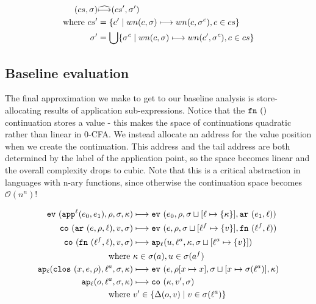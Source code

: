 \documentclass[preprint,onecolumn,9pt]{sigplanconf} %
\begin{document}
\begin{align*}
(cs, \msto) &\widehat{\machstep} (cs', \msto') \\
\mbox{where } cs' &= \{c' \mid wn(c, \msto) \machstep wn(c, \msto^c), c \in cs\} \\
              \msto' &= \bigcup\{\msto^c \mid wn(c,\msto)\machstep wn(c', \msto^c), c \in cs\}
\end{align*}

\subsection{Baseline evaluation}
\label{sec:baselineeval}

The final approximation we make to get to our baseline analysis is
store-allocating results of application sub-expressions. Notice that
the $\kfn{}$ continuation stores a value - this makes the space of
continuations quadratic rather than linear in 0-CFA. We instead
allocate an address for the value position when we create the
continuation. This address and the tail address are both determined by
the label of the application point, so the space becomes linear and
the overall complexity drops to cubic. Note that this is a critical
abstraction in languages with n-ary functions, since otherwise the
continuation space becomes ${\mathcal O}(n^n)$!

\begin{align*}
\ev{\sapp[^\mlab]{\mexpi0}{\mexpi1},\menv,\msto,\mkont} &\machstep
\ev{\mexpi{0},\menv,\msto\sqcup[\mlab \mapsto \{\mkont\}],\kar{\mexpi{1},\mlab}}
\\
\co{\kar{\mexp,\menv,\mlab},\mval,\msto} & \machstep
\ev{\mexp,\menv,\msto\sqcup[\mlab^f \mapsto \{\mval\}],\kfn{\mlab^f,\mlab}}
\\
\co{\kfn{\mlab^f,\mlab},\mval,\msto} & \machstep
\ap[_\mlab]{\mvalx{u},\mlab^a,\mkont,\msto\sqcup[\mlab^a \mapsto \{\mval\}]}
\\
\text{ where } &\mkont \in \msto(\maddr), \mvalx{u} \in \msto(\maddr^f)
\\
\ap[_\mlab]{\clos{\mvar,\mexp,\menv},\mlab^a, \msto,\mkont} & \machstep
\ev{\mexp,\menv[\mvar\mapsto\mvar],\msto\sqcup[\mvar \mapsto \msto(\mlab^a)],\mkont}
\\
\ap[_\mlab]{\mop,\mlab^a,\msto,\mkont} & \machstep
\co{\mkont,\mval',\msto}
\\
\text{ where }& \mval'\in \{\interpdelta(\mop,\mval) \mid \mval \in \msto(\mlab^a)\}
\end{align*}
\end{document}
